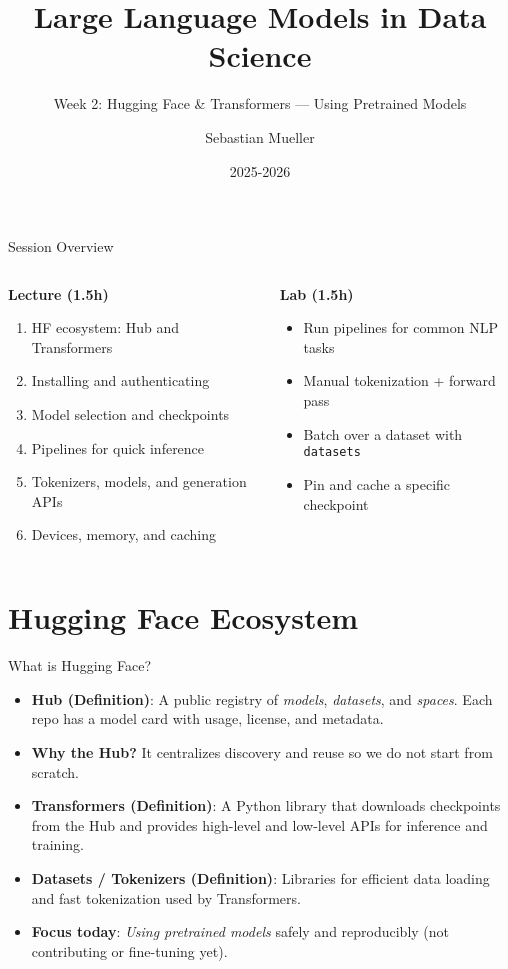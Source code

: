 \documentclass[aspectratio=169]{beamer}
\title{Large Language Models in Data Science}
\subtitle{Week 2: Hugging Face \& Transformers --- Using Pretrained Models}
\author{Sebastian Mueller}
\institute{Aix-Marseille Universit\'e}
\date{2025-2026}
\begin{document}
\begin{frame}[plain]
  \titlepage
\end{frame}

\begin{frame}{Session Overview}
  \begin{columns}[T,onlytextwidth]
    \begin{column}{0.55\linewidth}
      \textbf{Lecture (1.5h)}
      \begin{enumerate}
        \item HF ecosystem: Hub and Transformers
        \item Installing and authenticating
        \item Model selection and checkpoints
        \item Pipelines for quick inference
        \item Tokenizers, models, and generation APIs
        \item Devices, memory, and caching
      \end{enumerate}
    \end{column}
    \begin{column}{0.4\linewidth}
      \textbf{Lab (1.5h)}
      \begin{itemize}
        \item Run pipelines for common NLP tasks
        \item Manual tokenization + forward pass
        \item Batch over a dataset with \texttt{datasets}
        \item Pin and cache a specific checkpoint
      \end{itemize}
    \end{column}
  \end{columns}
\end{frame}

\section{Hugging Face Ecosystem}

\begin{frame}{What is Hugging Face?}
  \begin{itemize}
    \item \textbf{Hub (Definition)}: A public registry of \emph{models}, \emph{datasets}, and \emph{spaces}. Each repo has a model card with usage, license, and metadata.
    \item \textbf{Why the Hub?} It centralizes discovery and reuse so we do not start from scratch.
    \item \textbf{Transformers (Definition)}: A Python library that downloads checkpoints from the Hub and provides high-level and low-level APIs for inference and training.
  \item \textbf{Datasets / Tokenizers (Definition)}: Libraries for efficient data loading and fast tokenization used by Transformers.
    \item \textbf{Focus today}: \emph{Using pretrained models} safely and reproducibly (not contributing or fine-tuning yet).
  \end{itemize}
\end{frame}
\end{document}
